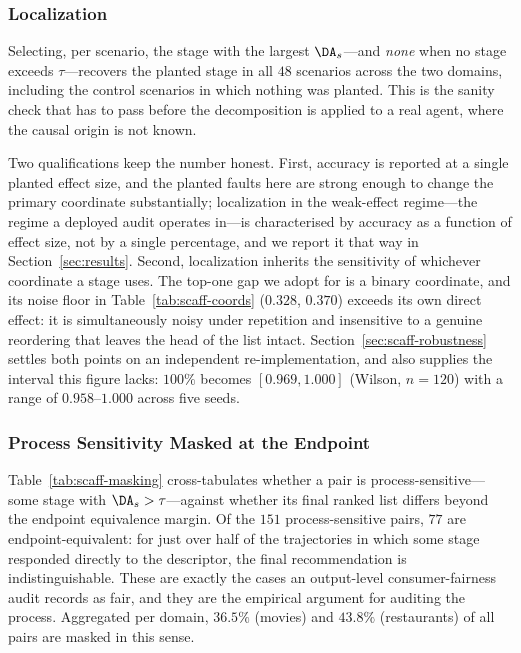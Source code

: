 \subsubsection{Localization}
\label{sec:scaff-localization}

Selecting, per scenario, the stage with the largest $\DA_s$---and \emph{none} when no stage
exceeds $\tau$---recovers the planted stage in all $48$ scenarios across the two domains,
including the control scenarios in which nothing was planted. This is the sanity check that has
to pass before the decomposition is applied to a real agent, where the causal origin is not
known.

Two qualifications keep the number honest. First, accuracy is reported at a single planted effect
size, and the planted faults here are strong enough to change the primary coordinate
substantially; localization in the weak-effect regime---the regime a deployed audit operates
in---is characterised by accuracy as a function of effect size, not by a single percentage, and we
report it that way in Section~\ref{sec:results}. Second, localization inherits the sensitivity of
whichever coordinate a stage uses. The top-one gap we adopt for  is a binary
coordinate, and its noise floor in Table~\ref{tab:scaff-coords} ($0.328$, $0.370$) exceeds its own
direct effect: it is simultaneously noisy under repetition and insensitive to a genuine
reordering that leaves the head of the list intact.
Section~\ref{sec:scaff-robustness} settles both points on an independent re-implementation, and
also supplies the interval this figure lacks: $100\%$ becomes $[0.969, 1.000]$ (Wilson, $n = 120$)
with a range of $0.958$--$1.000$ across five seeds.

\subsubsection{Process Sensitivity Masked at the Endpoint}
\label{sec:scaff-masking}

Table~\ref{tab:scaff-masking} cross-tabulates whether a pair is process-sensitive---some stage
with $\DA_s > \tau$---against whether its final ranked list differs beyond the endpoint
equivalence margin. Of the $151$ process-sensitive pairs, $77$ are endpoint-equivalent: for just
over half of the trajectories in which some stage responded directly to the descriptor, the final
recommendation is indistinguishable. These are exactly the cases an output-level consumer-fairness
audit records as fair, and they are the empirical argument for auditing the process. Aggregated
per domain, $36.5\%$ (movies) and $43.8\%$ (restaurants) of all pairs are masked in this sense.

